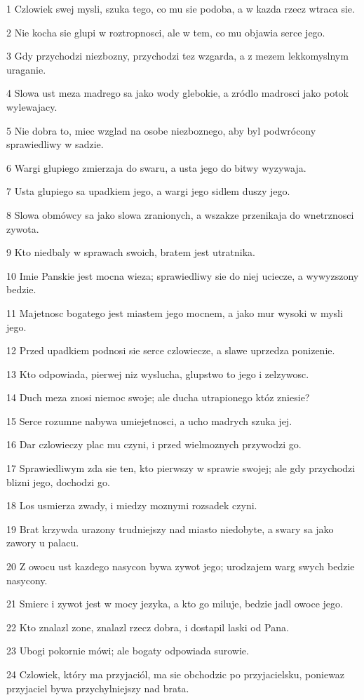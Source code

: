 \par 1 Czlowiek swej mysli, szuka tego, co mu sie podoba, a w kazda rzecz wtraca sie.
\par 2 Nie kocha sie glupi w roztropnosci, ale w tem, co mu objawia serce jego.
\par 3 Gdy przychodzi niezbozny, przychodzi tez wzgarda, a z mezem lekkomyslnym uraganie.
\par 4 Slowa ust meza madrego sa jako wody glebokie, a zródlo madrosci jako potok wylewajacy.
\par 5 Nie dobra to, miec wzglad na osobe niezboznego, aby byl podwrócony sprawiedliwy w sadzie.
\par 6 Wargi glupiego zmierzaja do swaru, a usta jego do bitwy wyzywaja.
\par 7 Usta glupiego sa upadkiem jego, a wargi jego sidlem duszy jego.
\par 8 Slowa obmówcy sa jako slowa zranionych, a wszakze przenikaja do wnetrznosci zywota.
\par 9 Kto niedbaly w sprawach swoich, bratem jest utratnika.
\par 10 Imie Panskie jest mocna wieza; sprawiedliwy sie do niej uciecze, a wywyzszony bedzie.
\par 11 Majetnosc bogatego jest miastem jego mocnem, a jako mur wysoki w mysli jego.
\par 12 Przed upadkiem podnosi sie serce czlowiecze, a slawe uprzedza ponizenie.
\par 13 Kto odpowiada, pierwej niz wyslucha, glupstwo to jego i zelzywosc.
\par 14 Duch meza znosi niemoc swoje; ale ducha utrapionego któz zniesie?
\par 15 Serce rozumne nabywa umiejetnosci, a ucho madrych szuka jej.
\par 16 Dar czlowieczy plac mu czyni, i przed wielmoznych przywodzi go.
\par 17 Sprawiedliwym zda sie ten, kto pierwszy w sprawie swojej; ale gdy przychodzi blizni jego, dochodzi go.
\par 18 Los usmierza zwady, i miedzy moznymi rozsadek czyni.
\par 19 Brat krzywda urazony trudniejszy nad miasto niedobyte, a swary sa jako zawory u palacu.
\par 20 Z owocu ust kazdego nasycon bywa zywot jego; urodzajem warg swych bedzie nasycony.
\par 21 Smierc i zywot jest w mocy jezyka, a kto go miluje, bedzie jadl owoce jego.
\par 22 Kto znalazl zone, znalazl rzecz dobra, i dostapil laski od Pana.
\par 23 Ubogi pokornie mówi; ale bogaty odpowiada surowie.
\par 24 Czlowiek, który ma przyjaciól, ma sie obchodzic po przyjacielsku, poniewaz przyjaciel bywa przychylniejszy nad brata.

